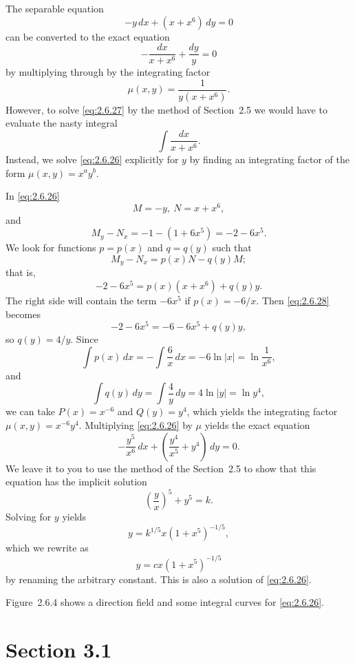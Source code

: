 \setcounter{example}{3}
\setcounter{equation}{25}
\begin{example}
  \label{example:2.6.4} \rm The separable equation
  \begin{equation}
    \label{eq:2.6.26}-y\,dx+(x+x^{6})\,dy=0
  \end{equation}
  can be converted to the exact equation
  \begin{equation}
    \label{eq:2.6.27}-\frac{dx}{x+x^{6}}+\frac{dy}{y}=0
  \end{equation}
  by multiplying through by the integrating factor
  \[
    \mu(x,y)=\frac{1}{y(x+x^{6})}.
  \]
  However, to solve \eqref{eq:2.6.27} by the method of Section~2.5 we would have to evaluate the
  nasty integral
  \[
    \int\frac{dx}{x+x^{6}}.
  \]
  Instead, we solve \eqref{eq:2.6.26} explicitly for $y$ by finding an integrating factor of the
  form $\mu(x,y)=x^{a}y^{b}$.
\end{example}
\setcounter{equation}{27}
\begin{examplesolution}
\solution In \eqref{eq:2.6.26}
\[
  M=-y,\ N=x+x^{6},
\]
and
\[
  M_{y}-N_{x}=-1-(1+6x^{5})=-2-6x^{5}.
\]
We look for functions $p=p(x)$ and $q=q(y)$ such that
\[
  M_{y}-N_{x}=p(x)N-q(y)M;
\]
that is,
\begin{equation}
  \label{eq:2.6.28}-2-6x^{5}=p(x)(x+x^{6})+q(y)y.
\end{equation}
The right side will contain the term $-6x^{5}$ if $p(x)=-6/x$. Then \eqref{eq:2.6.28} becomes
\[
  -2-6x^{5}=-6-6x^{5}+q(y)y,
\]
so $q(y)=4/y$. Since
\[
  \int p(x)\,dx=-\int\frac{6}{x}\,dx=-6\ln|x|=\ln\frac{1}{x^{6}},
\]
and
\[
  \int q(y)\,dy=\int\frac{4}{y}\,dy=4\ln |y|=\ln{y^{4}},
\]
we can take $P(x)=x^{-6}$ and $Q(y)=y^{4}$, which yields the integrating factor
$\mu(x,y)=x^{-6}y^{4}$. Multiplying \eqref{eq:2.6.26} by $\mu$ yields the exact equation
\[
  -\frac{y^{5}}{x^{6}}\,dx+\left(\frac{y^{4}}{x^{5}}+y^{4}\right) \,dy=0.
\]
We leave it to you to use the method of the Section~2.5 to show that this equation has the implicit
solution
\[
  \left(\frac{y}{x}\right)^{5}+y^{5}=k.
\]
Solving for $y$ yields
\[
  y=k^{1/5}x(1+x^{5})^{-1/5},
\]
which we rewrite as
\[
  y=cx(1+x^{5})^{-1/5}
\]
by renaming the arbitrary constant. This is also a solution of \eqref{eq:2.6.26}.

Figure~2.6.4 shows a direction field and some integral curves for \eqref{eq:2.6.26}.
\end{examplesolution}

\section*{Section 3.1}
{}
\setcounter{chapter}{3}
\setcounter{section}{1}

